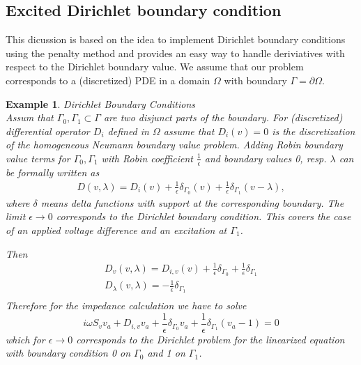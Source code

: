 \documentclass[12pt]{amsproc}
\newtheorem{example}{Example}
\begin{document}
\subsection{Excited Dirichlet boundary condition}
This dicussion is based on the idea to implement Dirichlet boundary conditions using the
penalty method and provides an easy way to handle deriviatives with respect to
the Dirichlet boundary value. We assume that our problem corresponds to a (discretized) PDE
in a domain $\Omega$ with boundary $\Gamma=\partial\Omega$.
\begin{example}{Dirichlet Boundary Conditions}\\
  Assum that $\Gamma_0,\Gamma_1\subset \Gamma$  are two disjunct parts of
  the boundary.
  For (discretized) differential operator $D_i$ defined
  in $\Omega$ assume that $D_i(v)=0$ is the discretization of the
  homogeneous Neumann boundary value problem. Adding Robin boundary value terms
  for $\Gamma_0, \Gamma_1$ with Robin coefficient $\frac1\epsilon$ and boundary values
  0, resp. $\lambda$ can be formally
  written as
  \begin{align*}
  D(v,\lambda)= D_i(v)
  +\frac1\epsilon\delta_{\Gamma_0}(v)
  +\frac1\epsilon\delta_{\Gamma_1}(v-\lambda),    
  \end{align*}
  where $\delta$ means delta functions with support at the corresponding boundary.
  The limit $\epsilon\to 0$  corresponds to the Dirichlet boundary condition.
  This covers the case of an
  applied voltage difference  and an excitation at $\Gamma_1$.
  

  Then  
\begin{equation*}
  \begin{split}
    D_v(v,\lambda)= D_{i,v}(v)+ \frac1\epsilon\delta_{\Gamma_0}+ \frac1\epsilon\delta_{\Gamma_1}\\
    D_\lambda(v,\lambda)= -\frac1\epsilon\delta_{\Gamma_1}\\
   \end{split}
\end{equation*}
Therefore  for the impedance calculation we have to solve 
\begin{equation*}
  i\omega S_v v_a + D_{i,v} v_a +\frac1\epsilon\delta_{\Gamma_0}v_a +\frac1\epsilon\delta_{\Gamma_1}(v_a-1) =0
\end{equation*}
which for $\epsilon\to 0$ corresponds to the Dirichlet problem  for the linearized equation 
with boundary condition 0 on $\Gamma_0$ and 1 on $\Gamma_1$.
\end{example}
\end{document}
